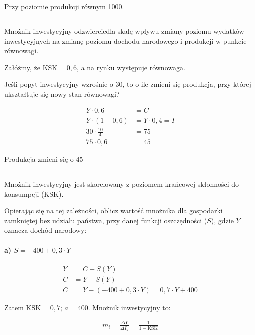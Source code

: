 \documentclass[a4paper,12pt]{article}
\begin{document}
Przy poziomie produkcji równym 1000.

\subsection{}

Mnożnik inwestycyjny odzwierciedla skalę wpływu zmiany poziomu wydatków inwestycyjnych na zmianę poziomu dochodu narodowego i produkcji w punkcie równowagi.

Załóżmy, że $\text{KSK} = 0,6$, a na rynku występuje równowaga.

Jeśli popyt inwestycyjny wzrośnie o 30, to o ile zmieni się produkcja, przy której ukształtuje się nowy stan równowagi?

\begin{align*}
	Y \cdot 0,6                  & = C               \\
	Y \cdot \left(1 - 0,6\right) & = Y \cdot 0,4 = I \\
	30 \cdot \frac{10}{4}        & = 75              \\
	75 \cdot 0,6                 & = 45
\end{align*}

Produkcja zmieni się o 45


\subsection{}
Mnożnik inwestycyjny jest skorelowany z poziomem krańcowej skłonności do konsumpcji (KSK).

Opierając się na tej zależności, oblicz wartość mnożnika dla gospodarki zamkniętej bez udziału państwa, przy danej funkcji oszczędności ($S$), gdzie $Y$ oznacza dochód narodowy:

\paragraph*{a) $S = -400 + 0,3\cdot Y$}
\begin{align*}
	Y & = C + S\left(Y\right)                                       \\
	C & = Y - S\left(Y\right)                                       \\
	C & = Y - \left( - 400 + 0,3 \cdot Y\right) = 0,7 \cdot Y + 400
\end{align*}

Zatem $\text{KSK} = 0,7$; $a = 400$. Mnożnik inwestycyjny to:

\begin{align*}
	m_i = \frac{\Delta Y}{\Delta I_a} = \frac{1}{1 - \text{KSK}}
\end{align*}
\end{document}
